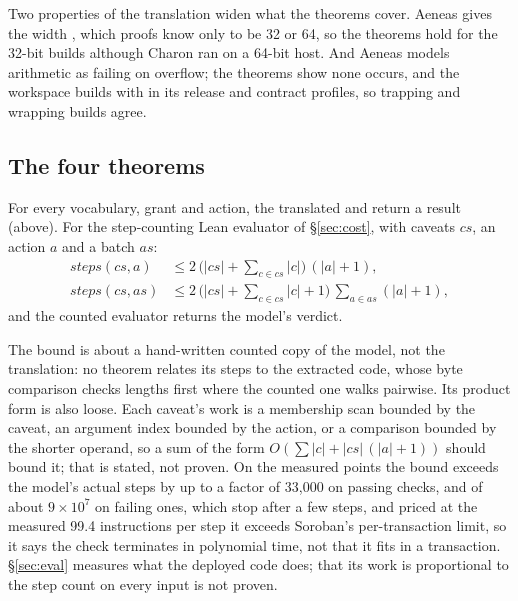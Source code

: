 Two properties of the translation widen what the theorems cover. Aeneas gives
 the width , which proofs know only
to be 32 or 64, so the theorems hold for the 32-bit 
builds although Charon ran on a 64-bit host. And Aeneas models arithmetic as
failing on overflow; the theorems show none occurs, and the workspace builds
with  in its release and contract profiles, so
trapping and wrapping builds agree.

\subsection{The four theorems}

\begin{mainthm}\label{thm:total}
For every vocabulary, grant and action, the translated  and
 return a result (above). For the step-counting Lean
evaluator of \S\ref{sec:cost}, with caveats $cs$, an action $a$ and a batch
$as$:
\begin{align*}
\mathit{steps}(cs, a) &\le 2\,\bigl(|cs| + \textstyle\sum_{c\in cs} |c|\bigr)\,(|a| + 1),\\
\mathit{steps}(cs, as) &\le 2\,\bigl(|cs| + \textstyle\sum_{c\in cs} |c| + 1\bigr)\,\textstyle\sum_{a\in as}(|a| + 1),
\end{align*}
and the counted evaluator returns the model's verdict.
\end{mainthm}
\noindent The bound is about a hand-written counted copy of the model, not the
translation: no theorem relates its steps to the extracted code, whose byte
comparison checks lengths first where the counted one walks pairwise. Its
product form is also loose. Each caveat's work is a membership scan bounded by
the caveat, an argument index bounded by the action, or a comparison bounded
by the shorter operand, so a sum of the form
$O(\sum|c| + |cs|\,(|a|+1))$ should bound it; that is stated, not proven. On
the measured points the bound exceeds the model's actual steps by up to a
factor of 33,000 on passing checks, and of about $9\times10^7$ on failing
ones, which stop after a few steps, and priced at the measured 99.4
instructions per step it exceeds Soroban's per-transaction limit, so it says
the check terminates in polynomial time, not that it fits in a transaction.
\S\ref{sec:eval} measures what the deployed code does;
that its work is proportional to the step count on every input is not
proven.

